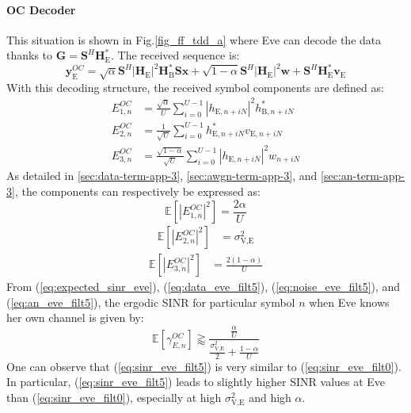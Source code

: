 \documentclass[12pt, draftclsnofoot, onecolumn]{IEEEtran}
\newcommand{\module}[1]{\left|#1\right|}
\newcommand{\EX}[1]{\mathbb{E} \left[#1\right]}%
\newcommand{\HE}{\textbf{H}_{\text{E}}}
\newcommand{\HB}{\textbf{H}_{\text{B}}}
\newcommand{\ve}{\textbf{v}_{\text{E}}}
\newcommand{\spread}{\textbf{S}}
\newcommand{\w}{\textbf{w}}
\begin{document}
\paragraph{OC Decoder}
\label{sec:own-channel-knowledge}
This situation is shown in Fig.\ref{fig_ff_tdd_a} where Eve can decode the data thanks to $\textbf{G} = \spread^H \HE^*$. The received sequence is:
\begin{equation}
	\textbf{y}_{\text{E}}^{OC} = \sqrt{\alpha} \spread^H \module{\HE}^2 \HB^* \spread\textbf{x} +  \sqrt{1-\alpha} \spread^H \module{\HE}^2 \w  +  \spread^H  \HE^*  \ve
	\label{eq:rx_eve_filt5}
\end{equation}
With this decoding structure, the received symbol components are defined as:
\begin{equation}
\begin{split}
E_{1,n}^{OC} &= \frac{\sqrt{\alpha}}{U}\sum_{i=0}^{U-1}  \left|h_{\text{E}, n + iN}\right|^2  h_{\text{B}, n + iN}^* \\
E_{2,n}^{OC} &= \frac{1}{\sqrt{U}}\sum_{i=0}^{U-1} h^*_{\text{E}, n + iN}  v_{\text{E}, n + iN}\\
E_{3,n}^{OC} &=\frac{ \sqrt{1-\alpha}  }{\sqrt{U}}\sum_{i=0}^{U-1}   \left|h_{\text{E}, n + iN}\right|^2 w_{n + iN}
\end{split}
\end{equation}
As detailed in  \ref{sec:data-term-app-3},  \ref{sec:awgn-term-app-3}, and \ref{sec:an-term-app-3}, the components can respectively be expressed as:
\begin{equation}
\EX{|E_{1,n}^{OC}|^2} = \frac{2\alpha}{U}
\label{eq:data_eve_filt5}
\end{equation}
\begin{equation}
\begin{split}
\EX{|E_{2,n}^{OC}|^2} &= \sigma^2_{\text{V,E}}
\end{split}
\label{eq:noise_eve_filt5}
\end{equation}
\begin{equation}
\begin{split}
\EX{|E_{3,n}^{OC}|^2}  &=  \frac{2(1-\alpha)}{U}
\end{split}
\label{eq:an_eve_filt5}
\end{equation}
From (\ref{eq:expected_sinr_eve}), (\ref{eq:data_eve_filt5}), (\ref{eq:noise_eve_filt5}), and (\ref{eq:an_eve_filt5}),  the ergodic SINR for particular symbol $n$ when Eve knows her own channel is given by:
\begin{equation}
\EX{\gamma_{E,n}^{OC}} \gtrapprox \frac{\frac{\alpha }{U}}{\frac{\sigma^2_{\text{V,E}}}{2} + \frac{1-\alpha}{U}}
\label{eq:sinr_eve_filt5}
\end{equation}
One can observe that (\ref{eq:sinr_eve_filt5}) is very similar to (\ref{eq:sinr_eve_filt0}). In particular, (\ref{eq:sinr_eve_filt5}) leads to slightly higher SINR values at Eve than (\ref{eq:sinr_eve_filt0}), especially at high $\sigma^2_{\text{V,E}}$ and high $\alpha$. 
\end{document}
